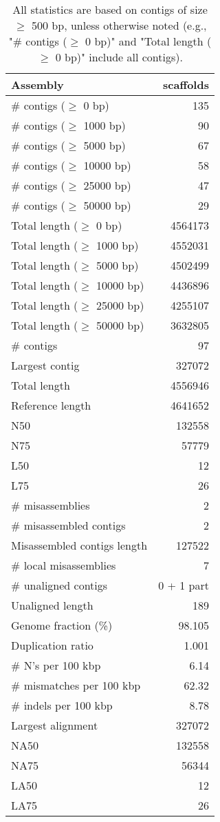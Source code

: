 \documentclass[12pt,a4paper]{article}
\begin{document}
\begin{table}[ht]
\begin{center}
\caption{All statistics are based on contigs of size $\geq$ 500 bp, unless otherwise noted (e.g., "\# contigs ($\geq$ 0 bp)" and "Total length ($\geq$ 0 bp)" include all contigs).}
\begin{tabular}{|l*{1}{|r}|}
\hline
Assembly & scaffolds \\ \hline
\# contigs ($\geq$ 0 bp) & 135 \\ \hline
\# contigs ($\geq$ 1000 bp) & 90 \\ \hline
\# contigs ($\geq$ 5000 bp) & 67 \\ \hline
\# contigs ($\geq$ 10000 bp) & 58 \\ \hline
\# contigs ($\geq$ 25000 bp) & 47 \\ \hline
\# contigs ($\geq$ 50000 bp) & 29 \\ \hline
Total length ($\geq$ 0 bp) & 4564173 \\ \hline
Total length ($\geq$ 1000 bp) & 4552031 \\ \hline
Total length ($\geq$ 5000 bp) & 4502499 \\ \hline
Total length ($\geq$ 10000 bp) & 4436896 \\ \hline
Total length ($\geq$ 25000 bp) & 4255107 \\ \hline
Total length ($\geq$ 50000 bp) & 3632805 \\ \hline
\# contigs & 97 \\ \hline
Largest contig & 327072 \\ \hline
Total length & 4556946 \\ \hline
Reference length & 4641652 \\ \hline
N50 & 132558 \\ \hline
N75 & 57779 \\ \hline
L50 & 12 \\ \hline
L75 & 26 \\ \hline
\# misassemblies & 2 \\ \hline
\# misassembled contigs & 2 \\ \hline
Misassembled contigs length & 127522 \\ \hline
\# local misassemblies & 7 \\ \hline
\# unaligned contigs & 0 + 1 part \\ \hline
Unaligned length & 189 \\ \hline
Genome fraction (\%) & 98.105 \\ \hline
Duplication ratio & 1.001 \\ \hline
\# N's per 100 kbp & 6.14 \\ \hline
\# mismatches per 100 kbp & 62.32 \\ \hline
\# indels per 100 kbp & 8.78 \\ \hline
Largest alignment & 327072 \\ \hline
NA50 & 132558 \\ \hline
NA75 & 56344 \\ \hline
LA50 & 12 \\ \hline
LA75 & 26 \\ \hline
\end{tabular}
\end{center}
\end{table}
\end{document}
